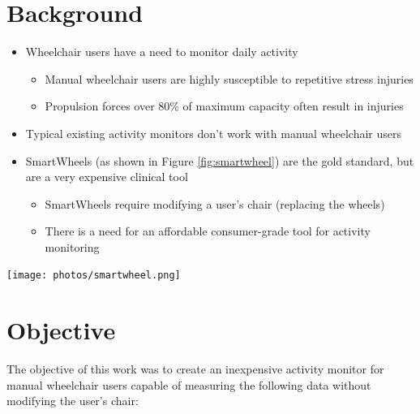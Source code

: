 \documentclass[a0,landscape]{a0poster}
\newenvironment{Figure}
  {\par\medskip\noindent\minipage{\linewidth}}
  {\endminipage\par\medskip}
\begin{document}
\vspace{4cm}

\begin{multicols*}{3}
\large

\section*{Background}
\begin{itemize}
    \item Wheelchair users have a need to monitor daily activity
        \begin{itemize}
            \item Manual wheelchair users are highly susceptible to repetitive stress injuries %
            \item Propulsion forces over 80\% of maximum capacity often result in injuries %
        \end{itemize}
    \item Typical existing activity monitors don't work with manual wheelchair users
    \item SmartWheels (as shown in Figure \ref{fig:smartwheel}) are the gold standard, but are a very expensive clinical tool \cite{asato93}
        \begin{itemize}
            \item SmartWheels require modifying a user's chair (replacing the wheels)
            \item There is a need for an affordable consumer-grade tool for activity monitoring
        \end{itemize}
\end{itemize}

\begin{Figure}
    \centering
    \texttt{[image: photos/smartwheel.png]}
    \label{fig:smartwheel}
\end{Figure}

\section*{Objective}
The objective of this work was to create an inexpensive activity monitor for manual wheelchair users capable of measuring the following data without modifying the user's chair:


\end{multicols*}
\end{document}
